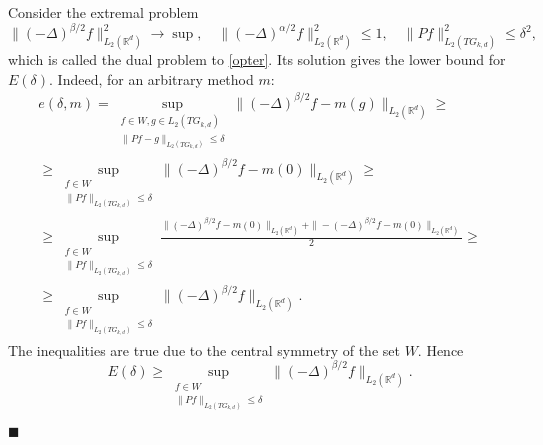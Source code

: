 \documentclass[12pt]{iopart}
\newenvironment{proof}
{\par\noindent{\bf Proof}}
{\hfill$\scriptstyle\blacksquare$}
\begin{document}
\begin{proof}
Consider the extremal problem
\[
  \|(-\Delta)^{\beta/2}f\|^2_{L_2(\mathbb R^d)}\to\sup,\quad \|
  (-\Delta)^{\alpha/2}f\|^2_{L_2(\mathbb R^d)}\leqslant  1,\quad
  \|Pf\|^2_{L_2(TG_{k,d})}\leqslant  \delta^2,
\] which is called the dual problem to \eqref{opter}.
Its solution gives the lower bound for $E(\delta)$. Indeed, for an arbitrary method $m$:
\begin{multline*}
e(\delta,m)= \sup_{
\begin{smallmatrix}
f\in W, g\in L_2(TG_{k,d})\\ 
\|Pf-g\|_{L_2(TG_{k,d})}\leqslant \delta
\end{smallmatrix}}
\|(-\Delta)^{\beta/2}f-m(g)\|_{L_2(\mathbb{R}^d)}\geqslant\\
\geqslant\sup_{
\begin{smallmatrix}
f\in W\\ 
\|Pf\|_{L_2(TG_{k,d})}\leqslant \delta
\end{smallmatrix}}
\|(-\Delta)^{\beta/2}f-m(0)\|_{L_2(\mathbb{R}^d)}\geqslant \\
\geqslant \sup_{
\begin{smallmatrix}
f\in W\\ 
\|Pf\|_{L_2(TG_{k,d})}\leqslant \delta
\end{smallmatrix}}
\frac{\|(-\Delta)^{\beta/2}f-m(0)\|_{L_2(\mathbb{R}^d)}+\|-(-\Delta)^{\beta/2}f-m(0)\|_{L_2(\mathbb{R}^d)}}{2}\geqslant \\
\geqslant\sup_{
\begin{smallmatrix}
f\in W\\ 
\|Pf\|_{L_2(TG_{k,d})}\leqslant \delta
\end{smallmatrix}}
\|(-\Delta)^{\beta/2}f\|_{L_2(\mathbb{R}^d)}.
\end{multline*}
The inequalities are true due to the central symmetry of the set $W$. Hence
$$E(\delta)\ge\sup_{
\begin{smallmatrix}
f\in W\\ 
\|Pf\|_{L_2(TG_{k,d})}\leqslant \delta
\end{smallmatrix}}
\|(-\Delta)^{\beta/2}f\|_{L_2(\mathbb{R}^d)}.$$


\end{proof}
\end{document}
